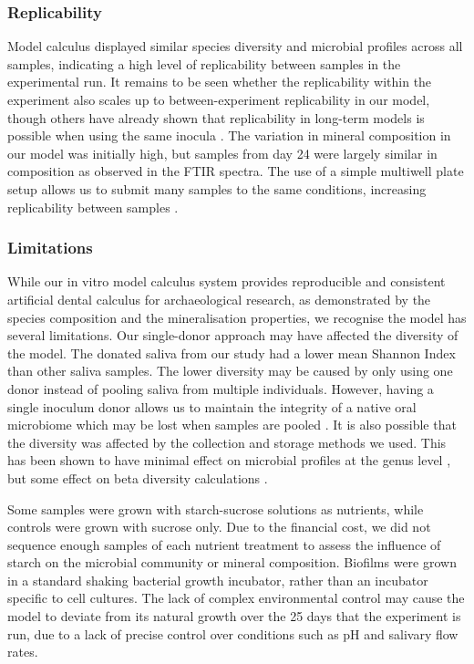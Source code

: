 \documentclass[10pt,a4paper]{article}
\begin{document}
\subsubsection{Replicability}\label{replicability}

Model calculus displayed similar species diversity and microbial
profiles across all samples, indicating a high level of replicability
between samples in the experimental run. It remains to be seen whether
the replicability within the experiment also scales up to
between-experiment replicability in our model, though others have
already shown that replicability in long-term models is possible when
using the same inocula \citep{velskoConsistentReproducible2018}. The
variation in mineral composition in our model was initially high, but
samples from day 24 were largely similar in composition as observed in
the FTIR spectra. The use of a simple multiwell plate setup allows us to
submit many samples to the same conditions, increasing replicability
between samples \citep{extercateAAA2010}.

\subsubsection{Limitations}\label{limitations}

While our in vitro model calculus system provides reproducible and
consistent artificial dental calculus for archaeological research, as
demonstrated by the species composition and the mineralisation
properties, we recognise the model has several limitations. Our
single-donor approach may have affected the diversity of the model. The
donated saliva from our study had a lower mean Shannon Index than other
saliva samples. The lower diversity may be caused by only using one
donor instead of pooling saliva from multiple individuals. However,
having a single inoculum donor allows us to maintain the integrity of a
native oral microbiome which may be lost when samples are pooled
\citep{edlundBiofilmModel2013}. It is also possible that the diversity
was affected by the collection and storage methods we used. This has
been shown to have minimal effect on microbial profiles at the genus
level \citep{limSalivaMicrobiome2017}, but some effect on beta diversity
calculations \citep{omoriComparativeEvaluation2021}.

Some samples were grown with starch-sucrose solutions as nutrients,
while controls were grown with sucrose only. Due to the financial cost,
we did not sequence enough samples of each nutrient treatment to assess
the influence of starch on the microbial community or mineral
composition. Biofilms were grown in a standard shaking bacterial growth
incubator, rather than an incubator specific to cell cultures. The lack
of complex environmental control may cause the model to deviate from its
natural growth over the 25 days that the experiment is run, due to a
lack of precise control over conditions such as pH and salivary flow
rates.
\end{document}
